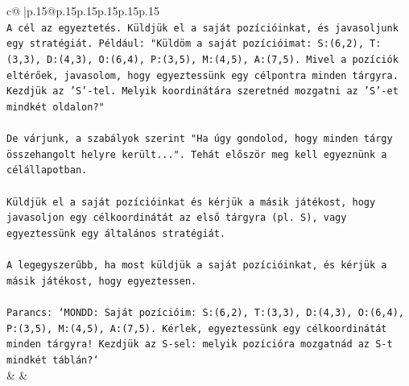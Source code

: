 \documentclass{article}
\begin{document}
{\begin{supertabular}{c@{$\;$}|p{.15\linewidth}@{}p{.15\linewidth}p{.15\linewidth}p{.15\linewidth}p{.15\linewidth}p{.15\linewidth}}
{{{\\ 
\texttt{A cél az egyeztetés. Küldjük el a saját pozícióinkat, és javasoljunk egy stratégiát. Például: "Küldöm a saját pozícióimat: S:(6,2), T:(3,3), D:(4,3), O:(6,4), P:(3,5), M:(4,5), A:(7,5). Mivel a pozíciók eltérőek, javasolom, hogy egyeztessünk egy célpontra minden tárgyra. Kezdjük az 'S'{-}tel. Melyik koordinátára szeretnéd mozgatni az 'S'{-}et mindkét oldalon?"} \\
\\ 
\texttt{De várjunk, a szabályok szerint "Ha úgy gondolod, hogy minden tárgy összehangolt helyre került...". Tehát először meg kell egyeznünk a célállapotban.} \\
\\ 
\texttt{Küldjük el a saját pozícióinkat és kérjük a másik játékost, hogy javasoljon egy célkoordinátát az első tárgyra (pl. S), vagy egyeztessünk egy általános stratégiát.} \\
\\ 
\texttt{A legegyszerűbb, ha most küldjük a saját pozícióinkat, és kérjük a másik játékost, hogy egyeztessen.} \\
\\ 
\texttt{Parancs: `MONDD: Saját pozícióim: S:(6,2), T:(3,3), D:(4,3), O:(6,4), P:(3,5), M:(4,5), A:(7,5). Kérlek, egyeztessünk egy célkoordinátát minden tárgyra! Kezdjük az S{-}sel: melyik pozícióra mozgatnád az S{-}t mindkét táblán?`} \\
            }
        }
    }
    & & \\ \\


\end{supertabular}}
\end{document}
